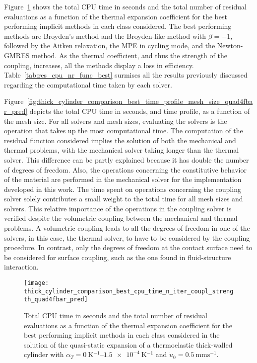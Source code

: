 Figure~\ref{fig:thick_cylinder_comparison_best_cpu_time_n_iter_coupl_strength_quad4fbar_pred} shows the total CPU time in seconds and the total number of residual evaluations as a function of the thermal expansion coefficient for the best performing implicit methods in each class considered.
The best performing methods are Broyden's method and the Broyden-like method with \(\beta=-1\), followed by the Aitken relaxation, the MPE in cycling mode, and the Newton-GMRES method.
As the thermal coefficient, and thus the strength of the coupling, increases, all the methods display a loss in efficiency.
Table~\ref{tab:res_cpu_nr_func_best} surmises all the results previously discussed regarding the computational time taken by each solver.

Figure~\ref{fig:thick_cylinder_comparison_best_time_profile_mesh_size_quad4fbar_pred} depicts the total CPU time in seconds, and time profile, as a function of the mesh size.
For all solvers and mesh sizes, evaluating the solvers is the operation that takes up the most computational time.
The computation of the residual function considered implies the solution of both the mechanical and thermal problems, with the mechanical solver taking longer than the thermal solver.
This difference can be partly explained because it has double the number of degrees of freedom.
Also, the operations concerning the constitutive behavior of the material are performed in the mechanical solver for the implementation developed in this work.
The time spent on operations concerning the coupling solver solely contributes a small weight to the total time for all mesh sizes and solvers.
This relative importance of the operations in the coupling solver is verified despite the volumetric coupling between the mechanical and thermal problems.
A volumetric coupling leads to all the degrees of freedom in one of the solvers, in this case, the thermal solver, to have to be considered by the coupling procedure.
In contrast, only the degrees of freedom at the contact surface need to be considered for surface coupling, such as the one found in fluid-structure interaction.

\begin{figure}[hbtp]
 \centering
 \texttt{[image: thick\_cylinder\_comparison\_best\_cpu\_time\_n\_iter\_coupl\_strength\_quad4fbar\_pred]}
 \caption{Total CPU time in seconds and the total number of residual evaluations as a function of the thermal expansion coefficient for the  best performing implicit methods in each class considered in the solution of the quasi-static expansion of a thermoelastic thick-walled cylinder with \(\alpha_T=\SIrange{0}{1.5e-4}{\kelvin^{-1}}\) and \(\dot u_0 =\SI{0.5}{\milli\meter\second^{-1}}\).}
\label{fig:thick_cylinder_comparison_best_cpu_time_n_iter_coupl_strength_quad4fbar_pred}
\end{figure}

